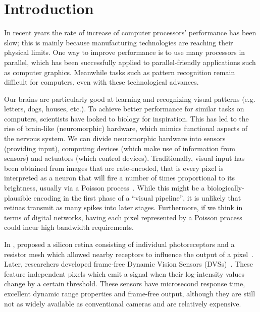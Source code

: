 \documentclass[conference]{IEEEtran}
\begin{document}
\section{Introduction}

In recent years the rate of increase of computer processors' performance has been slow; this is mainly because manufacturing technologies are reaching their physical limits. One way to improve performance is to use many processors in parallel, which has been successfully applied to parallel-friendly applications such as computer graphics. Meanwhile tasks such as pattern recognition remain difficult for computers, even with these technological advances.

Our brains are particularly good at learning and recognizing visual patterns (e.g. letters, dogs, houses, etc.). To achieve better performance for similar tasks on computers, scientists have looked to biology for inspiration. This has led to the rise of brain-like (neuromorphic) hardware, which mimics functional aspects of the nervous system. We can divide neuromorphic hardware into sensors (providing input), computing devices (which make use of information from sensors) and actuators (which control devices). Traditionally, visual input has been obtained from images that are rate-encoded, that is every pixel is interpreted as a neuron that will fire a number of times proportional to its brightness, usually via a Poisson process~\cite{snyder2012random}. While this might be a biologically-plausible encoding in the first phase of a ``visual pipeline'', it is unlikely that retinas transmit as many spikes into later stages. Furthermore, if we think in terms of digital networks, having each pixel represented by a Poisson process could incur high bandwidth requirements. 

In \citeyear{Mead1989}, \citeauthor{Mead1989} proposed a silicon retina consisting of individual photoreceptors and a resistor mesh which allowed nearby receptors to influence the output of a pixel~\cite{Mead1989}. 
Later, researchers developed frame-free Dynamic Vision Sensors (DVSs)~\cite{delbruckDVS,bernabeDVS}. These feature independent pixels which emit a signal when their log-intensity values change by a certain threshold.
These sensors have microsecond response time, excellent dynamic range properties and frame-free output, although they are still not as widely available as conventional cameras and are relatively expensive.
\end{document}
